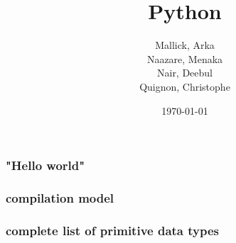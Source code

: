 \documentclass{beamer}
\begin{document}
\title{Python}
\subtitle{}
\author{
  Mallick, Arka\\
  Naazare, Menaka \\
  Nair, Deebul\\
  Quignon, Christophe \\
} 
\date{\today}

\begin{frame}
\titlepage
\end{frame}





\begin{frame}
\frametitle{"Hello world"}
\framesubtitle{}
 
 \begin{figure}
 \center
\end{figure}
 
\end{frame}

\begin{frame}
\frametitle{compilation model}
\framesubtitle{}
  
\end{frame}

\begin{frame}
\frametitle{complete list of primitive data types}
\framesubtitle{}
  
\end{frame}
\end{document}
